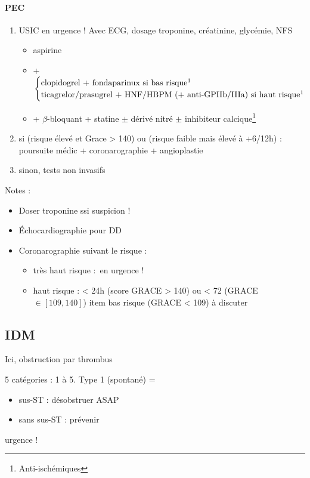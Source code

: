 \paragraph{PEC}
\begin{enumerate}
\item USIC en urgence ! Avec ECG, dosage troponine, créatinine, glycémie, NFS
  \begin{itemize}
  \item aspirine
  \item +
    $\begin{cases}
      \text{clopidogrel + fondaparinux si bas risque}\footnotemark\\
      \addtocounter{footnote}{-1}
\text{ticagrelor/prasugrel + HNF/HBPM (+ anti-GPIIb/IIIa) si haut risque}\footnotemark

\end{cases}$
  \item + $\beta$-bloquant + statine $\pm$ dérivé nitré $\pm$ inhibiteur
    calcique\footnote{Anti-ischémiques}
  \end{itemize}
\item si (risque élevé et Grace > 140) ou (risque faible mais élevé à +6/12h) :
  poursuite médic + coronarographie + angioplastie
\item sinon, tests non invasifs
\end{enumerate}

Notes :
\begin{itemize}
\item Doser troponine ssi suspicion !
\item Échocardiographie pour DD
\item Coronarographie suivant le risque :
\begin{itemize}
  \item très haut risque : en urgence !
  \item haut risque : < 24h (score GRACE > 140) ou < 72 (GRACE $\in [109, 140]$)
  item bas risque (GRACE < 109)  à discuter 
\end{itemize}
\end{itemize}

\subsection{IDM}

Ici, obstruction par thrombus

5 catégories : 1 à 5. Type 1 (spontané) =
\begin{itemize}
  \item sus-ST : désobstruer ASAP
  \item sans sus-ST : prévenir
\end{itemize}
\danger urgence ! \skull

